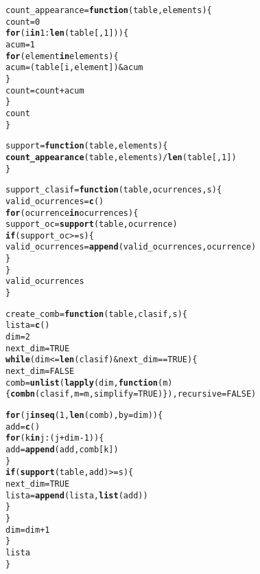 \documentclass[12pt]{report}\usepackage[]{graphicx}\usepackage[dvipsnames]{xcolor}
\makeatletter
\newcommand{\hlnum}[1]{\textcolor[rgb]{0.686,0.059,0.569}{#1}}%
\newcommand{\hlopt}[1]{\textcolor[rgb]{0,0,0}{#1}}%
\newcommand{\hlstd}[1]{\textcolor[rgb]{0.345,0.345,0.345}{#1}}%
\newcommand{\hlkwa}[1]{\textcolor[rgb]{0.161,0.373,0.58}{\textbf{#1}}}%
\newcommand{\hlkwb}[1]{\textcolor[rgb]{0.69,0.353,0.396}{#1}}%
\newcommand{\hlkwc}[1]{\textcolor[rgb]{0.333,0.667,0.333}{#1}}%
\newcommand{\hlkwd}[1]{\textcolor[rgb]{0.737,0.353,0.396}{\textbf{#1}}}%
\newenvironment{kframe}{%
 \def\at@end@of@kframe{}%
 \ifinner\ifhmode%
  \def\at@end@of@kframe{\end{minipage}}%
  \begin{minipage}{\columnwidth}%
 \fi\fi%
 \def\FrameCommand##1{\hskip\@totalleftmargin \hskip-\fboxsep
 \colorbox{shadecolor}{##1}\hskip-\fboxsep
     \hskip-\linewidth \hskip-\@totalleftmargin \hskip\columnwidth}%
 \MakeFramed {\advance\hsize-\width
   \@totalleftmargin\z@ \linewidth\hsize
   \@setminipage}}%
 {\par\unskip\endMakeFramed%
 \at@end@of@kframe}
\newenvironment{knitrout}{}{} %
\makeatother
\begin{document}
\begin{knitrout}
\begin{kframe}
\begin{alltt}
\hlstd{count_appearance} \hlkwb{=} \hlkwa{function}\hlstd{(}\hlkwc{table}\hlstd{,} \hlkwc{elements}\hlstd{)\{}
\hlstd{count} \hlkwb{=} \hlnum{0}
\hlkwa{for} \hlstd{(i} \hlkwa{in} \hlnum{1}\hlopt{:}\hlkwd{len}\hlstd{(table[,}\hlnum{1}\hlstd{]))\{}
\hlstd{acum} \hlkwb{=} \hlnum{1}
\hlkwa{for} \hlstd{(element} \hlkwa{in} \hlstd{elements)\{}
\hlstd{acum} \hlkwb{=} \hlstd{(table[i,element])} \hlopt{&} \hlstd{acum}
\hlstd{\}}
\hlstd{count} \hlkwb{=} \hlstd{count} \hlopt{+} \hlstd{acum}
\hlstd{\}}
\hlstd{count}
\hlstd{\}}

\hlstd{support} \hlkwb{=} \hlkwa{function}\hlstd{(}\hlkwc{table}\hlstd{,} \hlkwc{elements}\hlstd{) \{}
\hlkwd{count_appearance}\hlstd{(table, elements)} \hlopt{/} \hlkwd{len}\hlstd{(table[,}\hlnum{1}\hlstd{])}
\hlstd{\}}

\hlstd{support_clasif} \hlkwb{=} \hlkwa{function}\hlstd{(}\hlkwc{table}\hlstd{,} \hlkwc{ocurrences}\hlstd{,} \hlkwc{s}\hlstd{)\{}
\hlstd{valid_ocurrences} \hlkwb{=} \hlkwd{c}\hlstd{()}
\hlkwa{for} \hlstd{(ocurrence} \hlkwa{in} \hlstd{ocurrences)\{}
\hlstd{support_oc} \hlkwb{=} \hlkwd{support}\hlstd{(table, ocurrence)}
\hlkwa{if} \hlstd{(support_oc} \hlopt{>=} \hlstd{s)\{}
\hlstd{valid_ocurrences} \hlkwb{=} \hlkwd{append}\hlstd{(valid_ocurrences, ocurrence)}
\hlstd{\}}
\hlstd{\}}
\hlstd{valid_ocurrences}
\hlstd{\}}

\hlstd{create_comb} \hlkwb{=} \hlkwa{function}\hlstd{(}\hlkwc{table}\hlstd{,} \hlkwc{clasif}\hlstd{,} \hlkwc{s}\hlstd{) \{}
\hlstd{lista} \hlkwb{=} \hlkwd{c}\hlstd{()}
\hlstd{dim} \hlkwb{=} \hlnum{2}
\hlstd{next_dim} \hlkwb{=} \hlnum{TRUE}
\hlkwa{while} \hlstd{(dim} \hlopt{<=} \hlkwd{len}\hlstd{(clasif)} \hlopt{&} \hlstd{next_dim} \hlopt{==} \hlnum{TRUE}\hlstd{) \{}
\hlstd{next_dim} \hlkwb{=} \hlnum{FALSE}
\hlstd{comb} \hlkwb{=} \hlkwd{unlist}\hlstd{(}\hlkwd{lapply}\hlstd{(dim,} \hlkwa{function}\hlstd{(}\hlkwc{m}\hlstd{) \{}\hlkwd{combn}\hlstd{(clasif,} \hlkwc{m}\hlstd{=m,} \hlkwc{simplify}\hlstd{=}\hlnum{TRUE}\hlstd{)\}),} \hlkwc{recursive}\hlstd{=}\hlnum{FALSE}\hlstd{)}

\hlkwa{for} \hlstd{(j} \hlkwa{in} \hlkwd{seq}\hlstd{(}\hlnum{1}\hlstd{,} \hlkwd{len}\hlstd{(comb),} \hlkwc{by}\hlstd{=dim)) \{}
\hlstd{add} \hlkwb{=} \hlkwd{c}\hlstd{()}
\hlkwa{for} \hlstd{(k} \hlkwa{in} \hlstd{j}\hlopt{:}\hlstd{(j}\hlopt{+}\hlstd{dim}\hlopt{-}\hlnum{1}\hlstd{)) \{}
\hlstd{add} \hlkwb{=} \hlkwd{append}\hlstd{(add, comb[k])}
\hlstd{\}}
\hlkwa{if} \hlstd{(}\hlkwd{support}\hlstd{(table, add)} \hlopt{>=} \hlstd{s) \{}
\hlstd{next_dim} \hlkwb{=} \hlnum{TRUE}
\hlstd{lista} \hlkwb{=} \hlkwd{append}\hlstd{(lista,} \hlkwd{list}\hlstd{(add))}
\hlstd{\}}
\hlstd{\}}
\hlstd{dim} \hlkwb{=} \hlstd{dim}\hlopt{+}\hlnum{1}
\hlstd{\}}
\hlstd{lista}
\hlstd{\}}


\end{alltt}
\end{kframe}
\end{knitrout}
\end{document}

